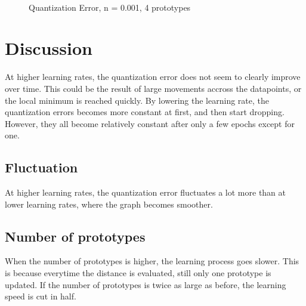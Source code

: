 \documentclass[10pt,a4paper]{article}
\begin{document}
\begin{figure}
  \centering
{} \\
  \caption{Quantization Error, n = 0.001, 4 prototypes}
  \label{fig:n0001_k4_learning}
\end{figure}

\section{Discussion}
At higher learning rates, the quantization error does not seem to clearly improve over time. This could be the result of large movements accross the datapoints, or the local minimum is reached quickly. By lowering the learning rate, the quantization errors becomes more constant at first, and then start dropping. However, they all become relatively constant after only a few epochs except for one. 

\subsection{Fluctuation}
At higher learning rates, the quantization error fluctuates a lot more than at lower learning rates, where the graph becomes smoother.

\subsection{Number of prototypes}
When the number of prototypes is higher, the learning process goes slower. This is because everytime the distance is evaluated, still only one prototype is updated. If the number of prototypes is twice as large as before, the learning speed is cut in half.
\end{document}
